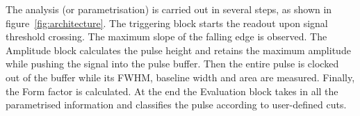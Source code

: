 The analysis (or parametrisation) is carried out in several steps, as shown in figure~\ref{fig:architecture}. The triggering block starts the readout upon signal threshold crossing. The maximum slope of the falling edge is observed. The Amplitude block calculates the pulse height and retains the maximum amplitude while pushing the signal into the pulse buffer. Then the entire pulse is clocked out of the buffer while its FWHM, baseline width and area are measured. Finally, the Form factor is calculated. At the end the Evaluation block takes in all the parametrised information and classifies the pulse according to user-defined cuts. 


